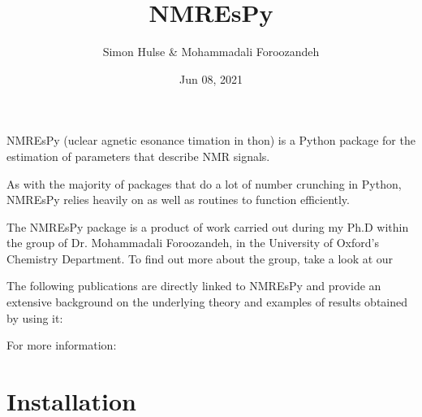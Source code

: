 \documentclass[letterpaper,10pt,english]{sphinxmanual}
\title{NMR\sphinxhyphen{}EsPy}
\date{Jun 08, 2021}
\author{Simon Hulse \& Mohammadali Foroozandeh}
\let\sphinxpxdimen\pdfpxdimen\else\newdimen\sphinxpxdimen
\begin{document}
\pagestyle{empty}
\sphinxmaketitle
\pagestyle{plain}
\sphinxtableofcontents
\pagestyle{normal}
\label{\detokenize{index::doc}}


\noindent{\hspace*{\fill}\sphinxincludegraphics[width=250\sphinxpxdimen]{{nmrespy_full}.png}\hspace*{\fill}}

\sphinxAtStartPar
{}

\sphinxAtStartPar
NMR\sphinxhyphen{}EsPy (uclear agnetic esonance timation in
thon) is a Python package for the estimation of parameters that
describe NMR signals.

\sphinxAtStartPar
As with the majority of packages that do a lot of number crunching in Python,
NMR\sphinxhyphen{}EsPy relies heavily on  as well as
 routines to function efficiently.

\sphinxAtStartPar
The NMR\sphinxhyphen{}EsPy package is a product of work carried out during my Ph.D
within the group of Dr. Mohammadali Foroozandeh, in the University of
Oxford’s Chemistry Department. To find out more about the group, take a look
at our 

\sphinxAtStartPar
The following publications are directly linked to NMR\sphinxhyphen{}EsPy and provide
an extensive background on the underlying theory and examples of results
obtained by using it:

\sphinxAtStartPar
{}

\sphinxAtStartPar
For more information:

\sphinxAtStartPar
{} 

\sphinxAtStartPar
{} 





\chapter{Installation}
\end{document}
